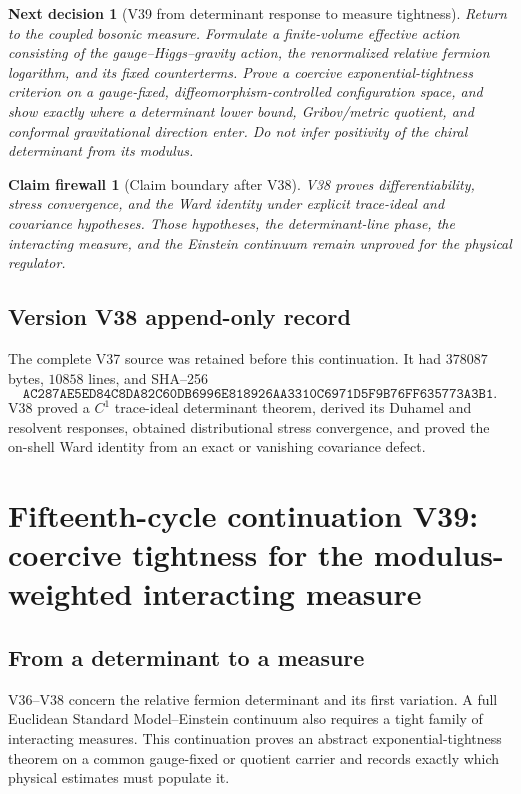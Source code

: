 \documentclass[11pt]{article}
\newtheorem{firewall}[theorem]{Claim firewall}
\newtheorem{decision}[theorem]{Next decision}
\theoremstyle{remark}
\begin{document}
\begin{decision}[V39 from determinant response to measure tightness]
\label{dec:v15v38-next}
Return to the coupled bosonic measure.  Formulate a finite-volume
effective action consisting of the gauge--Higgs--gravity action,
the renormalized relative fermion logarithm, and its fixed
counterterms.  Prove a coercive exponential-tightness criterion on a
gauge-fixed, diffeomorphism-controlled configuration space, and show
exactly where a determinant lower bound, Gribov/metric quotient, and
conformal gravitational direction enter.  Do not infer positivity
of the chiral determinant from its modulus.
\end{decision}

\begin{firewall}[Claim boundary after V38]
\label{fire:v15v38}
V38 proves differentiability, stress convergence, and the Ward
identity under explicit trace-ideal and covariance hypotheses.
Those hypotheses, the determinant-line phase, the interacting
measure, and the Einstein continuum remain unproved for the physical
regulator.
\end{firewall}

\section*{Version V38 append-only record}
The complete V37 source was retained before this continuation.  It
had \(378087\) bytes, \(10858\) lines, and SHA--256
\[
 \texttt{AC287AE5ED84C8DA82C60DB6996E818926AA3310C6971D5F9B76FF635773A3B1}.
\]
V38 proved a \(C^1\) trace-ideal determinant theorem, derived its
Duhamel and resolvent responses, obtained distributional stress
convergence, and proved the on-shell Ward identity from an exact or
vanishing covariance defect.

\chapter{Fifteenth-cycle continuation V39: coercive tightness for the modulus-weighted interacting measure}
\label{sec:v15v39}

\section{From a determinant to a measure}

V36--V38 concern the relative fermion determinant and its first
variation.  A full Euclidean Standard Model--Einstein continuum also
requires a tight family of interacting measures.  This continuation
proves an abstract exponential-tightness theorem on a common
gauge-fixed or quotient carrier and records exactly which physical
estimates must populate it.
\end{document}
